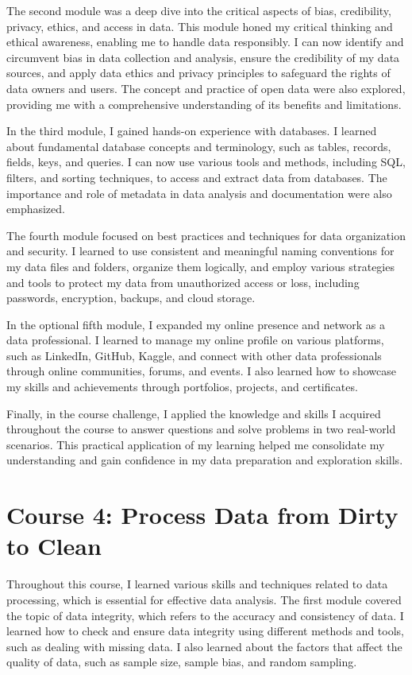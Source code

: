 \documentclass[]{article}
\begin{document}
The second module was a deep dive into the critical aspects of bias, credibility, privacy, ethics, and access in data. This module honed my critical thinking and ethical awareness, enabling me to handle data responsibly. I can now identify and circumvent bias in data collection and analysis, ensure the credibility of my data sources, and apply data ethics and privacy principles to safeguard the rights of data owners and users. The concept and practice of open data were also explored, providing me with a comprehensive understanding of its benefits and limitations.

In the third module, I gained hands-on experience with databases. I learned about fundamental database concepts and terminology, such as tables, records, fields, keys, and queries. I can now use various tools and methods, including SQL, filters, and sorting techniques, to access and extract data from databases. The importance and role of metadata in data analysis and documentation were also emphasized.

The fourth module focused on best practices and techniques for data organization and security. I learned to use consistent and meaningful naming conventions for my data files and folders, organize them logically, and employ various strategies and tools to protect my data from unauthorized access or loss, including passwords, encryption, backups, and cloud storage.

In the optional fifth module, I expanded my online presence and network as a data professional. I learned to manage my online profile on various platforms, such as LinkedIn, GitHub, Kaggle, and connect with other data professionals through online communities, forums, and events. I also learned how to showcase my skills and achievements through portfolios, projects, and certificates.

Finally, in the course challenge, I applied the knowledge and skills I acquired throughout the course to answer questions and solve problems in two real-world scenarios. This practical application of my learning helped me consolidate my understanding and gain confidence in my data preparation and exploration skills.

\section{Course 4: Process Data from Dirty to Clean}
Throughout this course, I learned various skills and techniques related to data processing, which is essential for effective data analysis. The first module covered the topic of data integrity, which refers to the accuracy and consistency of data. I learned how to check and ensure data integrity using different methods and tools, such as dealing with missing data. I also learned about the factors that affect the quality of data, such as sample size, sample bias, and random sampling.
\end{document}
